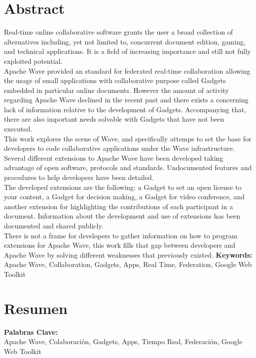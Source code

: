\newpage
\renewcommand{\thepage}{\Roman{page}}
\setcounter{page}{9}
\chapter*{Abstract}
Real-time online collaborative software grants the user a broad collection of alternatives including, yet not limited to, concurrent document edition, gaming, and technical applications. It is a field of increasing importance and still not fully exploited potential.\\[.2cm]
Apache Wave provided an standard for federated real-time collaboration allowing the usage of small applications with collaborative purpose called Gadgets embedded in particular online documents. However the amount of activity regarding Apache Wave declined in the recent past and there exists a concerning lack of information relative to the development of Gadgets. Accompanying that, there are also important needs solvable with Gadgets that have not been executed.\\[.2cm]
This work explores the scene of Wave, and specifically attemps to set the base for developers to code collaborative applications under the Wave infrastructure. Several different extensions to Apache Wave have been developed taking advantage of open software, protocols and standards. Undocumented features and procedures to help developers have been detailed.\\[.2cm]
The developed extensions are the following: a Gadget to set an open license to your content, a Gadget for decision making, a Gadget for video conference, and another extension for highlighting the contributions of each participant in a document. Information about the development and use of extensions has been documented and shared publicly.\\[.2cm]
There is not a frame for developers to gather information on how to program extensions for Apache Wave, this work fills that gap between developers and Apache Wave by solving different weaknesses that previously existed.
\vfill
{\large \bf Keywords:}\\
{\large Apache Wave, Collaboration, Gadgets, Apps, Real Time, Federation, Google Web Toolkit}

\newpage
\renewcommand{\thepage}{\Roman{page}}
\setcounter{page}{10}
\chapter*{Resumen}

\vfill
{\large \bf Palabras Clave:}\\
{\large Apache Wave, Colaboración, Gadgets, Apps, Tiempo Real, Federación, Google Web Toolkit}

\newpage
\thispagestyle{empty}
\mbox{}

